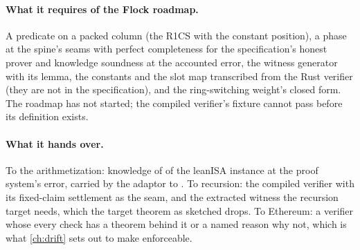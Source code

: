 \paragraph{What it requires of the Flock roadmap.} A predicate on a packed column (the R1CS
with the constant position), a phase at the spine's seams with perfect completeness for the
specification's honest prover and knowledge soundness at the accounted error, the witness
generator with its lemma, the constants and the slot map transcribed from the Rust verifier (they are
not in the specification), and the ring-switching weight's closed form. The roadmap has not
started; the compiled verifier's fixture cannot pass before its definition exists.

\paragraph{What it hands over.} To the arithmetization: knowledge of  of the
leanISA instance at the proof system's error, carried by the adaptor to . To
recursion: the compiled verifier with its fixed-claim settlement as the seam, and the extracted
witness the recursion target needs, which the target theorem as sketched drops. To Ethereum: a
verifier whose every check has a theorem behind it or a named reason why not, which is what
\cref{ch:drift} sets out to make enforceable.
